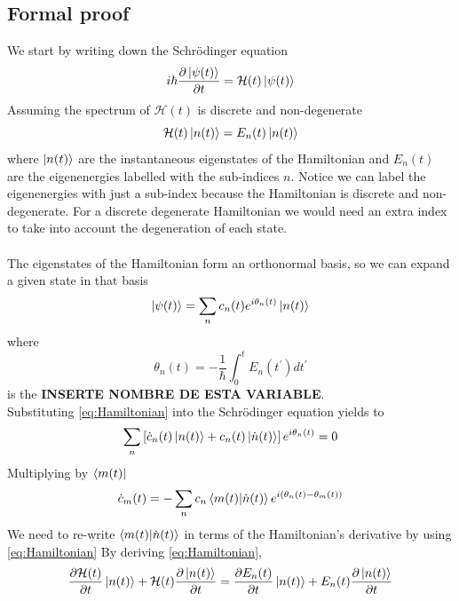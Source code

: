 \subsection{Formal proof}
We start by writing down the Schrödinger equation
\begin{equation}
    i\hbar \frac{\partial \ket{\psi(t)}}{\partial t} = \mathcal{H}(t)\ket{\psi(t)}
\end{equation}
Assuming the spectrum of $\mathcal{H}(t)$ is discrete and non-degenerate
\begin{equation}
\label{eq:Hamiltonian}
    \mathcal{H}(t) \ket{n(t)} = E_{n}(t)\ket{n(t)}
\end{equation}
where $\ket{n(t)}$ are the instantaneous eigenstates of the Hamiltonian and $E_{n}(t)$ are the eigenenergies labelled with the sub-indices $n$. Notice we can label the eigenenergies with just a sub-index because the Hamiltonian is discrete and non-degenerate. For a discrete degenerate Hamiltonian we would need an extra index to take into account the degeneration of each state.\\\\
The eigenstates of the Hamiltonian form an orthonormal basis, so we can expand a given state in that basis
\begin{equation}
\label{eq: EigenvectorExpansion}
    \ket{\psi(t)} = \sum_{n}c_{n}(t)e^{i\theta_{n}(t)} \ket{n(t)}
\end{equation}
where
\begin{equation}
    \theta_{n}(t) = -\frac{1}{\hbar}\int_{0}^{t}E_{n}(t^{\prime})dt^{\prime}
\end{equation}
is the \textbf{INSERTE NOMBRE DE ESTA VARIABLE}.\\
Substituting \ref{eq:Hamiltonian} into the Schrödinger equation yields to
\begin{equation}
    \sum_{n}\left[\dot{c}_{n}(t)\ket{n(t)} + c_{n}(t)\ket{\dot{n}(t)}\right]e^{i\theta_{n}(t)} = 0
\end{equation}
Multiplying by $\bra{m(t)}$
\begin{equation}
\label{eq:Coefficients}
    \dot{c}_{m}(t) = - \sum_{n}c_{n}\braket{m(t)|\dot{n}(t)}e^{i\left(\theta_{n}(t) - \theta_{m}(t)\right)}
\end{equation}
We need to re-write $\braket{m(t)|\dot{n}(t)}$ in terms of the Hamiltonian's derivative by using \ref{eq:Hamiltonian}
By deriving \ref{eq:Hamiltonian},
\begin{equation}
    \frac{\partial \mathcal{H}(t)}{\partial t}\ket{n(t)} + \mathcal{H}(t)\frac{\partial \ket{n(t)}}{\partial t} = \frac{\partial E_{n}(t)}{\partial t} \ket{n(t)} + E_{n}(t)\frac{\partial \ket{n(t)}}{\partial t} 
\end{equation}
